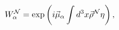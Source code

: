 \begin{equation}
\label{W}
W_\alpha^{\cal N}=\exp\left(i\vec\mu_\alpha\int d^3x\vec\rho^{\cal N}\eta\right),
\end{equation}

